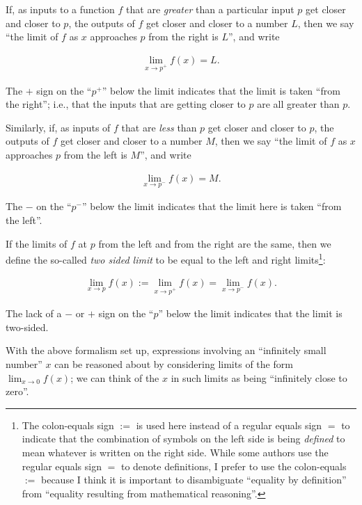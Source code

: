 \documentclass{article}
\begin{document}
If, as inputs to a function $f$ that are \textit{greater} than a particular input $p$ get closer and closer to $p$, the outputs of $f$ get closer and closer to a number $L$, then we say ``the limit of $f$ as $x$ approaches $p$ from the right is $L$'', and write

\begin{align*}
    \lim_{x \rightarrow p^+} f(x) = L.
\end{align*}

The $+$ sign on the ``$p^+$'' below the limit indicates that the limit is taken ``from the right''; i.e., that the inputs that are getting closer to $p$ are all greater than $p$.

Similarly, if, as inputs of $f$ that are \textit{less} than $p$ get closer and closer to $p$, the outputs of $f$ get closer and closer to a number $M$, then we say ``the limit of $f$ as $x$ approaches $p$ from the left is $M$'', and write

\begin{align*}
    \lim_{x \rightarrow p^-} f(x) = M.
\end{align*}

The $-$ on the ``$p^-$'' below the limit indicates that the limit here is taken ``from the left''.

If the limits of $f$ at $p$ from the left and from the right are the same, then we define the so-called \textit{two sided limit} to be equal to the left and right limits\footnote{The colon-equals sign $:=$ is used here instead of a regular equals sign $=$ to indicate that the combination of symbols on the left side is being \textit{defined} to mean whatever is written on the right side. While some authors use the regular equals sign $=$ to denote definitions, I prefer to use the colon-equals $:=$ because I think it is important to disambiguate ``equality by definition'' from ``equality resulting from mathematical reasoning''.}:

\begin{align*}
    \lim_{x \rightarrow p} f(x) 
    := \lim_{x \rightarrow p^+} f(x) 
    = \lim_{x \rightarrow p^-} f(x).
\end{align*}

The lack of a $-$ or $+ $ sign on the ``$p$'' below the limit indicates that the limit is two-sided.

With the above formalism set up, expressions involving an ``infinitely small number'' $x$ can be reasoned about by considering limits of the form $\lim_{x \rightarrow 0} f(x)$; we can think of the $x$ in such limits as being ``infinitely close to zero''.
\end{document}
